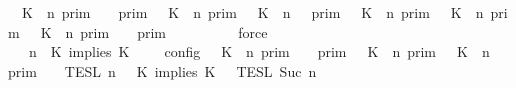 \begin{isabellebody}
\ {\isacartoucheopen}{\isasymlbrakk}\ K\ {\isasymnot}{\isasymUp}\ n\ {\isasymrbrakk}\isactrlsub p\isactrlsub r\isactrlsub i\isactrlsub m\ {\isasyminter}\ {\isasymlbrakk}{\isasymlbrakk}\ {\isasymGamma}\ {\isasymrbrakk}{\isasymrbrakk}\isactrlsub p\isactrlsub r\isactrlsub i\isactrlsub m\ {\isasymunion}\ {\isasymlbrakk}\ K\ {\isasymUp}\ n\ {\isasymrbrakk}\isactrlsub p\isactrlsub r\isactrlsub i\isactrlsub m\ {\isasyminter}\ {\isasymlbrakk}{\isasymlbrakk}\ {\isacharparenleft}K\ {\isasymUp}\ n{\isacharparenright}\ {\isacharhash}\ {\isasymGamma}\ {\isasymrbrakk}{\isasymrbrakk}\isactrlsub p\isactrlsub r\isactrlsub i\isactrlsub m\ {\isacharequal}\ {\isacharparenleft}{\isasymlbrakk}\ K\ {\isasymnot}{\isasymUp}\ n\ {\isasymrbrakk}\isactrlsub p\isactrlsub r\isactrlsub i\isactrlsub m\ {\isasymunion}\ {\isasymlbrakk}\ K\ {\isasymUp}\ n\ {\isasymrbrakk}\isactrlsub p\isactrlsub r\isactrlsub i\isactrlsub m\ {\isasyminter}\ {\isasymlbrakk}\ K\ {\isasymUp}\ n\ {\isasymrbrakk}\isactrlsub p\isactrlsub r\isactrlsub i\isactrlsub m{\isacharparenright}\ {\isasyminter}\ {\isasymlbrakk}{\isasymlbrakk}\ {\isasymGamma}\ {\isasymrbrakk}{\isasymrbrakk}\isactrlsub p\isactrlsub r\isactrlsub i\isactrlsub m{\isacartoucheclose}\isanewline
\ \ \ \ \ \ \ \ \isamarkupfalse%
\ force\isanewline
\ \ \ \ \ \ \isamarkupfalse%
\ \isamarkupfalse%
\ {\isacartoucheopen}{\isasymlbrakk}\ {\isasymGamma}{\isacharcomma}\ n\ {\isasymturnstile}\ {\isacharparenleft}{\isacharparenleft}K\ implies\ K\ {\isacharhash}\ {\isasymPsi}{\isacharparenright}\ {\isasymtriangleright}\ {\isasymPhi}\ {\isasymrbrakk}\isactrlsub c\isactrlsub o\isactrlsub n\isactrlsub f\isactrlsub i\isactrlsub g\ {\isacharequal}\ {\isacharparenleft}{\isasymlbrakk}\ K\ {\isasymnot}{\isasymUp}\ n\ {\isasymrbrakk}\isactrlsub p\isactrlsub r\isactrlsub i\isactrlsub m\ {\isasyminter}\ {\isasymlbrakk}{\isasymlbrakk}\ {\isasymGamma}\ {\isasymrbrakk}{\isasymrbrakk}\isactrlsub p\isactrlsub r\isactrlsub i\isactrlsub m\ {\isasymunion}\ {\isasymlbrakk}\ K\ {\isasymUp}\ n\ {\isasymrbrakk}\isactrlsub p\isactrlsub r\isactrlsub i\isactrlsub m\ {\isasyminter}\ {\isasymlbrakk}{\isasymlbrakk}\ {\isacharparenleft}K\ {\isasymUp}\ n{\isacharparenright}\ {\isacharhash}\ {\isasymGamma}\ {\isasymrbrakk}{\isasymrbrakk}\isactrlsub p\isactrlsub r\isactrlsub i\isactrlsub m{\isacharparenright}\ {\isasyminter}\ {\isacharparenleft}{\isasymlbrakk}{\isasymlbrakk}\ {\isasymPsi}\ {\isasymrbrakk}{\isasymrbrakk}\isactrlsub T\isactrlsub E\isactrlsub S\isactrlsub L\isactrlbsup {\isasymge}\ n\isactrlesup \ {\isasyminter}\ {\isasymlbrakk}{\isasymlbrakk}\ {\isacharparenleft}K\ implies\ K\ {\isacharhash}\ {\isasymPhi}\ {\isasymrbrakk}{\isasymrbrakk}\isactrlsub T\isactrlsub E\isactrlsub S\isactrlsub L\isactrlbsup {\isasymge}\ Suc\ n\isactrlesup {\isacharparenright}{\isacartoucheclose}\isanewline

\end{isabellebody}

